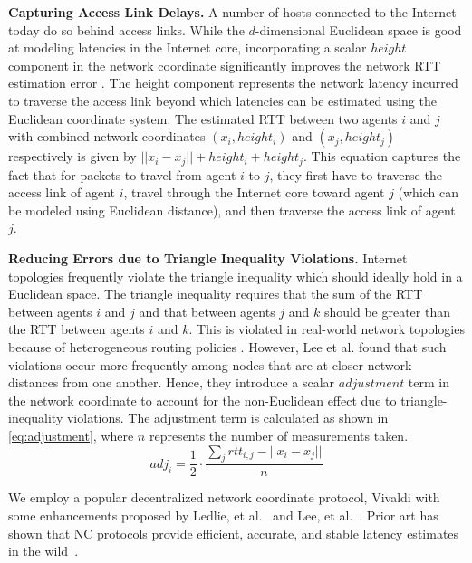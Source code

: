 \par \noindent \textbf{Capturing Access Link Delays. } A number of hosts connected to the Internet today do so behind access links. While the $d$-dimensional Euclidean space is good at modeling latencies in the Internet core, incorporating a scalar $height$ component in the network coordinate significantly improves the network RTT estimation error \cite{vivaldi}. The height component represents the network latency incurred to traverse the access link beyond which latencies can be estimated using the Euclidean coordinate system. The estimated RTT between two agents $i$ and $j$ with combined network coordinates $\left( x_i, height_i \right)$ and $\left( x_j, height_j \right)$ respectively is given by $|| x_i - x_j || + height_i + height_j$. This equation captures the fact that for packets to travel from agent $i$ to $j$, they first have to traverse the access link of agent $i$, travel through the Internet core toward agent $j$ (which can be modeled using Euclidean distance), and then traverse the access link of agent $j$. 

\par \noindent \textbf{Reducing Errors due to Triangle Inequality Violations. } Internet topologies frequently violate the triangle inequality which should ideally hold in a Euclidean space. The triangle inequality requires that the sum of the RTT between agents $i$ and $j$ and that between agents $j$ and $k$ should be greater than the RTT between agents $i$ and $k$. This is violated in real-world network topologies because of heterogeneous routing policies \cite{zheng2005internet}. However, Lee et al. \cite{lee2009suitability} found that such violations occur more frequently  among nodes that are at closer network distances from one another. Hence, they introduce a scalar $adjustment$ term in the network coordinate to account for the non-Euclidean effect due to triangle-inequality violations. The adjustment term is calculated as shown in \cref{eq:adjustment}, where $n$ represents the number of measurements taken.
\begin{equation}
adj_i = \dfrac{1}{2} \cdot \dfrac{\sum_{j} rtt_{i,j} - || x_i - x_j ||}{n}
\label{eq:adjustment}
\end{equation}

\par We employ a popular decentralized network coordinate protocol, Vivaldi \cite{vivaldi} with some enhancements proposed by Ledlie, et al.~\cite{ledlie2007network} and Lee, et al.~\cite{lee2009suitability}. Prior art has shown that NC protocols provide efficient, accurate, and stable latency estimates in the wild~\cite{ledlie2007network}.

